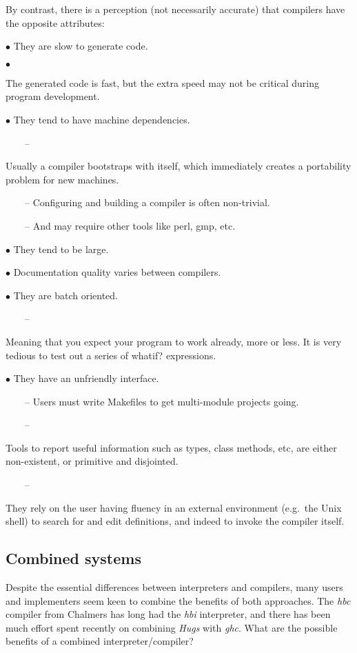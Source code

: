 \documentclass[a4paper]{article}
\begin{document}
\noindent
By contrast, there is a perception (not necessarily accurate) that
compilers have the opposite attributes:

$\bullet$
    They are slow to generate code.

$\bullet$
  \parbox[t]{155mm}{
    The generated code is fast, but the extra speed may not be
      critical during program development.}

$\bullet$
    They tend to have machine dependencies.

\ \ \ \ --
      \parbox[t]{150mm}{
        Usually a compiler bootstraps with itself, which
        immediately creates a portability problem for new machines.}

\ \ \ \ --
      Configuring and building a compiler is often non-trivial.

\ \ \ \ --
      And may require other tools like perl, gmp, etc.

$\bullet$
    They tend to be large.

$\bullet$
    Documentation quality varies between compilers.

$\bullet$
    They are batch oriented.

\ \ \ \ --
      \parbox[t]{150mm}{
        Meaning that you expect your program to work already, more or less.
        It is very tedious to test out a series of whatif? expressions.}

$\bullet$
    They have an unfriendly interface.

\ \ \ \ --
      Users must write Makefiles to get multi-module projects going.

\ \ \ \ --
      \parbox[t]{150mm}{
        Tools to report useful information such as types, class methods,
        etc, are either non-existent, or primitive and disjointed.}

\ \ \ \ --
      \parbox[t]{150mm}{
        They rely on the user having fluency in an external environment
        (e.g.\ the Unix shell) to search for and edit definitions, and
        indeed to invoke the compiler itself.}

\subsection{Combined systems}

Despite the essential differences between interpreters and compilers,
many users and implementers seem keen to combine the benefits of both
approaches.  The {\em hbc} compiler from Chalmers has long had the
{\em hbi} interpreter, and there has been much effort spent recently
on combining {\em Hugs} with {\em ghc}.  What are the possible
benefits of a combined interpreter/compiler?
\end{document}
